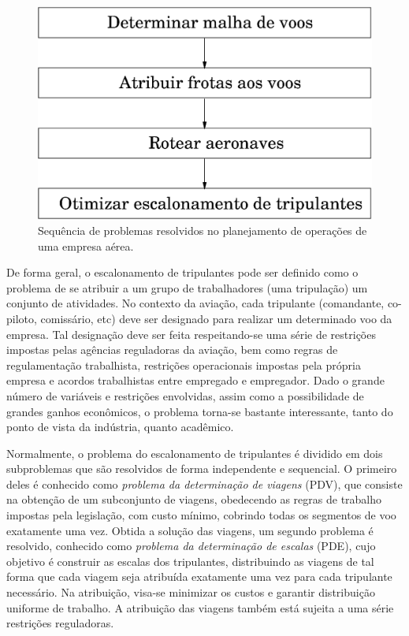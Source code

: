 \begin{figure}[htbp]
	\begin{center}
		\includegraphics[scale=0.5]{fig/planejamento.eps}
		\caption{Sequência de problemas resolvidos no planejamento de operações de uma empresa
		aérea.}
		\label{fig:planejamento}
	\end{center}
\end{figure}

De forma geral, o escalonamento de tripulantes pode ser definido como o problema de se atribuir a um
grupo de trabalhadores (uma tripulação) um conjunto de atividades. No contexto da aviação, cada
tripulante (comandante, co-piloto, comissário, etc) deve ser designado para realizar um determinado
voo da empresa. Tal designação deve ser feita respeitando-se uma série de restrições impostas pelas
agências reguladoras da aviação, bem como regras de regulamentação trabalhista, restrições
operacionais impostas pela própria empresa e acordos trabalhistas entre empregado e empregador. Dado
o grande número de variáveis e restrições envolvidas, assim como a possibilidade de grandes ganhos
econômicos, o problema torna-se bastante interessante, tanto do ponto de vista da indústria, quanto
acadêmico.

Normalmente, o problema do escalonamento de tripulantes é dividido em dois subproblemas que são
resolvidos de forma independente e sequencial. O primeiro deles é conhecido como \emph{problema da
determinação de viagens} (PDV), que consiste na obtenção de um subconjunto de viagens, obedecendo as
regras de trabalho impostas pela legislação, com custo mínimo, cobrindo todas os segmentos de voo
exatamente uma vez. Obtida a solução das viagens, um segundo problema é resolvido, conhecido como
\emph{problema da determinação de escalas} (PDE), cujo objetivo é construir as escalas dos
tripulantes, distribuindo as viagens de tal forma que cada viagem seja atribuída exatamente uma vez
para cada tripulante necessário. Na atribuição, visa-se minimizar os custos e garantir distribuição
uniforme de trabalho. A atribuição das viagens também está sujeita a uma série restrições
reguladoras.

